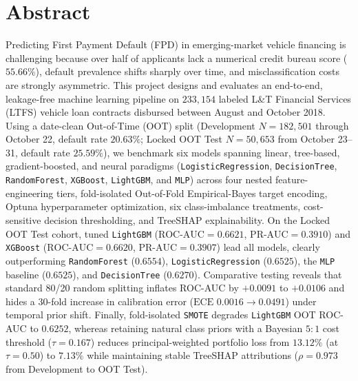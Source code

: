 \documentclass[12pt,a4paper,oneside]{article}
\begin{document}
\pagestyle{plain}

\section*{Abstract}
Predicting First Payment Default (FPD) in emerging-market vehicle financing is challenging because over half of applicants lack a numerical credit bureau score ($55.66\%$), default prevalence shifts sharply over time, and misclassification costs are strongly asymmetric. This project designs and evaluates an end-to-end, leakage-free machine learning pipeline on $233{,}154$ labeled L\&T Financial Services (LTFS) vehicle loan contracts disbursed between August and October 2018. Using a date-clean Out-of-Time (OOT) split (Development $N = 182{,}501$ through October 22, default rate $20.63\%$; Locked OOT Test $N = 50{,}653$ from October 23--31, default rate $25.59\%$), we benchmark six models spanning linear, tree-based, gradient-boosted, and neural paradigms (\texttt{LogisticRegression}, \texttt{DecisionTree}, \texttt{RandomForest}, \texttt{XGBoost}, \texttt{LightGBM}, and \texttt{MLP}) across four nested feature-engineering tiers, fold-isolated Out-of-Fold Empirical-Bayes target encoding, Optuna hyperparameter optimization, six class-imbalance treatments, cost-sensitive decision thresholding, and TreeSHAP explainability. On the Locked OOT Test cohort, tuned \texttt{LightGBM} ($\text{ROC-AUC} = 0.6621$, $\text{PR-AUC} = 0.3910$) and \texttt{XGBoost} ($\text{ROC-AUC} = 0.6620$, $\text{PR-AUC} = 0.3907$) lead all models, clearly outperforming \texttt{RandomForest} ($0.6554$), \texttt{LogisticRegression} ($0.6525$), the \texttt{MLP} baseline ($0.6525$), and \texttt{DecisionTree} ($0.6270$). Comparative testing reveals that standard 80/20 random splitting inflates ROC-AUC by $+0.0091$ to $+0.0106$ and hides a $30$-fold increase in calibration error ($\text{ECE } 0.0016 \to 0.0491$) under temporal prior shift. Finally, fold-isolated \texttt{SMOTE} degrades \texttt{LightGBM} OOT ROC-AUC to $0.6252$, whereas retaining natural class priors with a Bayesian $5{:}1$ cost threshold ($\tau = 0.167$) reduces principal-weighted portfolio loss from $13.12\%$ (at $\tau = 0.50$) to $7.13\%$ while maintaining stable TreeSHAP attributions ($\rho = 0.973$ from Development to OOT Test).
\clearpage
\end{document}
